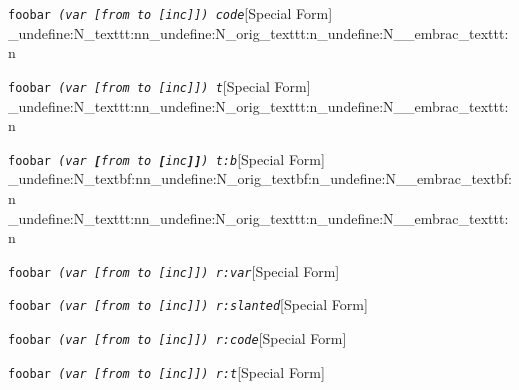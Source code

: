 \documentclass{book}
\newcommand\GNUTexinfocommandstyletextvar[1]{{\normalfont{}\textsl{#1}}}%
\begin{document}
%
\noindent\texttt{foobar \EmbracOn{}\textnormal{\textsl{(var \texttt{[}from to \texttt{[}inc\texttt{]]}) code}}\EmbracOff{}}\hfill[Special Form]
\ExplSyntaxOn%
\cs_undefine:N{\embrac_texttt:nn}\cs_undefine:N{\embrac_orig_texttt:n}\cs_undefine:N{\__embrac_texttt:n}%
\ExplSyntaxOff%

%
\noindent\texttt{foobar \EmbracOn{}\textnormal{\textsl{(var \texttt{[}from to \texttt{[}inc\texttt{]]}) t}}\EmbracOff{}}\hfill[Special Form]
\ExplSyntaxOn%
\cs_undefine:N{\embrac_texttt:nn}\cs_undefine:N{\embrac_orig_texttt:n}\cs_undefine:N{\__embrac_texttt:n}%
\ExplSyntaxOff%

%
\noindent\texttt{foobar \EmbracOn{}\textnormal{\textsl{(var \texttt{\textbf{[}}from to \texttt{\textbf{[}}inc\texttt{\textbf{]]}}) t:b}}\EmbracOff{}}\hfill[Special Form]
\ExplSyntaxOn%
\cs_undefine:N{\embrac_textbf:nn}\cs_undefine:N{\embrac_orig_textbf:n}\cs_undefine:N{\__embrac_textbf:n}%
\cs_undefine:N{\embrac_texttt:nn}\cs_undefine:N{\embrac_orig_texttt:n}\cs_undefine:N{\__embrac_texttt:n}%
\ExplSyntaxOff%

%
\noindent\texttt{foobar \EmbracOn{}\textnormal{\textsl{(var \EmbracOff{}\textnormal{\GNUTexinfocommandstyletextvar{[}}\EmbracOn{}from to \EmbracOff{}\textnormal{\GNUTexinfocommandstyletextvar{[}}\EmbracOn{}inc\EmbracOff{}\textnormal{\GNUTexinfocommandstyletextvar{]]}}\EmbracOn{}) r:var}}\EmbracOff{}}\hfill[Special Form]

%
\noindent\texttt{foobar \EmbracOn{}\textnormal{\textsl{(var \EmbracOff{}\textnormal{\textsl{[}}\EmbracOn{}from to \EmbracOff{}\textnormal{\textsl{[}}\EmbracOn{}inc\EmbracOff{}\textnormal{\textsl{]]}}\EmbracOn{}) r:slanted}}\EmbracOff{}}\hfill[Special Form]

%
\noindent\texttt{foobar \EmbracOn{}\textnormal{\textsl{(var \EmbracOff{}\textnormal{\texttt{[}}\EmbracOn{}from to \EmbracOff{}\textnormal{\texttt{[}}\EmbracOn{}inc\EmbracOff{}\textnormal{\texttt{]]}}\EmbracOn{}) r:code}}\EmbracOff{}}\hfill[Special Form]

%
\noindent\texttt{foobar \EmbracOn{}\textnormal{\textsl{(var \EmbracOff{}\textnormal{\texttt{[}}\EmbracOn{}from to \EmbracOff{}\textnormal{\texttt{[}}\EmbracOn{}inc\EmbracOff{}\textnormal{\texttt{]]}}\EmbracOn{}) r:t}}\EmbracOff{}}\hfill[Special Form]
\end{document}
